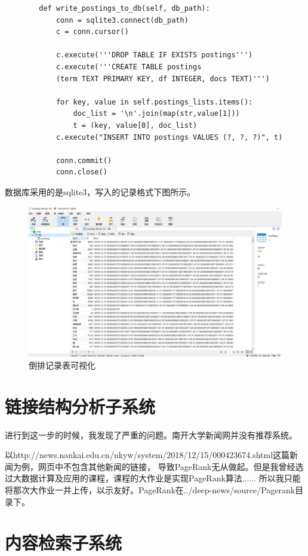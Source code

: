 \documentclass[12pt]{article}
\begin{document}
		\begin{lstlisting}
		def write_postings_to_db(self, db_path):
			conn = sqlite3.connect(db_path)
			c = conn.cursor()
			
			c.execute('''DROP TABLE IF EXISTS postings''')
			c.execute('''CREATE TABLE postings
			(term TEXT PRIMARY KEY, df INTEGER, docs TEXT)''')
			
			for key, value in self.postings_lists.items():
				doc_list = '\n'.join(map(str,value[1]))
				t = (key, value[0], doc_list)
			c.execute("INSERT INTO postings VALUES (?, ?, ?)", t)
			
			conn.commit()
			conn.close()
		\end{lstlisting}
		
		数据库采用的是sqlite3，写入的记录格式下图所示。
		
		\begin{figure}[h]
			\centering
			\includegraphics[width=0.7\linewidth]{screenshot008}
			\caption[倒排记录表可视化]{倒排记录表可视化}
			\label{倒排记录表可视化}
		\end{figure}
		
		
		\newpage
		
		\section{链接结构分析子系统}
		
		进行到这一步的时候，我发现了严重的问题。南开大学新闻网并没有推荐系统。
		
		以http://news.nankai.edu.cn/nkyw/system/2018/12/15/000423674.shtml这篇新闻为例，网页中不包含其他新闻的链接，
		导致PageRank无从做起。但是我曾经选过大数据计算及应用的课程，课程的大作业是实现PageRank算法......
		所以我只能将那次大作业一并上传，以示友好。PageRank在../deep-news/source/Pagerank目录下。
		
		\newpage
		
		\section{内容检索子系统}
		
\end{document}
